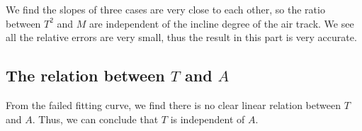 We find the slopes of three cases are very close to each other, 
so the ratio between $T^2$ and $M$  are independent of the incline degree of the air track.
We see all the relative errors are very small,
thus the result in this part is very accurate.

\subsection{The relation between $T$ and  $A$}

From the failed fitting curve, we find there is no clear linear relation between $T$ and $A$.
Thus, we can conclude that $T$ is independent of $A$.


